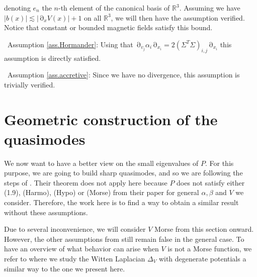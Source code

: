 \documentclass[12pt]{amsart}
\newcommand{\R}{\mathbb R}
\numberwithin{equation}{section}
\numberwithin{figure}{section}
\DeclareMathOperator{\p}{\partial}
\begin{document}
denoting %
$e_n$ the $n$-th element of the canonical basis of $\R^3$. Assuming we have $|b(x)| \lesssim |\p_xV(x)| + 1$ on all $\R^3$, we will then have the assumption verified. Notice that constant or bounded magnetic fields satisfy this bound.

\textbullet\ Assumption \ref{ass.Hormander}: Using that $\p_{v_j}\alpha_i\p_{x_i} = 2(\Sigma^T\Sigma)_{i,j}\p_{x_i}$ this assumption is directly satisfied.

\textbullet\ Assumption \ref{ass.accretive}: Since we have no divergence, this assumption is trivially verified.













































\section{Geometric construction of the quasimodes}\label{sec:geoloc}

We now want to have a better view on the small eigenvalues of $P$. For this purpose, we are going to build sharp quasimodes, and so we are following the steps of \cite[section 3\&4]{BoLePMi22}. Their theorem does not apply here because $P$ does not satisfy either (1.9), (Harmo), (Hypo) or (Morse) from their paper for general $\alpha,\beta$ and $V$ we consider. Therefore, the work here is to find a way to obtain a similar result without these assumptions.

Due to several inconvenience, we will consider $V$ Morse from this section onward. However, the other assumptions from \cite{BoLePMi22} still remain false in the general case. To have an overview of what behavior can arise when $V$ is not a Morse function, we refer to \cite{De25_1} where we study the Witten Laplacian $\Delta_V$ with degenerate potentials a similar way to the one we present here.
\end{document}
